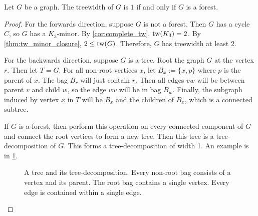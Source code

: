 \begin{proposition}\label{lem:treewidth_forest}
	Let $G$ be a graph. The treewidth of $G$ is $1$ if and only if \(G\) is a forest.
\end{proposition}

\begin{proof}
	For the forwards direction, suppose $G$ is not a forest. Then \(G\) has a cycle \(C\), so $G$ has a $K_3$-minor. By \cref{cor:complete_tw}, $\operatorname{tw}(K_3) = 2$. By \cref{thm:tw_minor_closure}, $2 \leq \operatorname{tw}(G)$. Therefore, $G$ has treewidth at least 2. 

	For the backwards direction, suppose \(G\) is a tree. Root the graph \(G\) at the vertex \(r\). Then let \(T = G\). For all non-root vertices $x$, let \(B_x:= \lbrace x, p \rbrace\) where \(p\) is the parent of \(x\). The bag \(B_r\) will just contain \(r\). Then all edges \(vw\) will be between parent \(v\) and child \(w\), so the edge $vw$ will be in bag \(B_w\). Finally, the subgraph induced by vertex \(x\) in \(T\) will be \(B_x\) and the children of \(B_x\), which is a connected subtree.

	If \(G\) is a forest, then perform this operation on every connected component of \(G\) and connect the root vertices to form a new tree. Then this tree is a tree-decomposition of $G$. This forms a tree-decomposition of width 1. An example is in \cref{fig:tree-treedecomp}.
	\begin{figure}[ht]
		\centering
		
		
		\caption[Tree-decomposition of a tree]{A tree and its tree-decomposition. Every non-root bag consists of a vertex and its parent. The root bag contains a single vertex. Every edge is contained within a single edge.}\label{fig:tree-treedecomp}
	\end{figure}
\end{proof}

